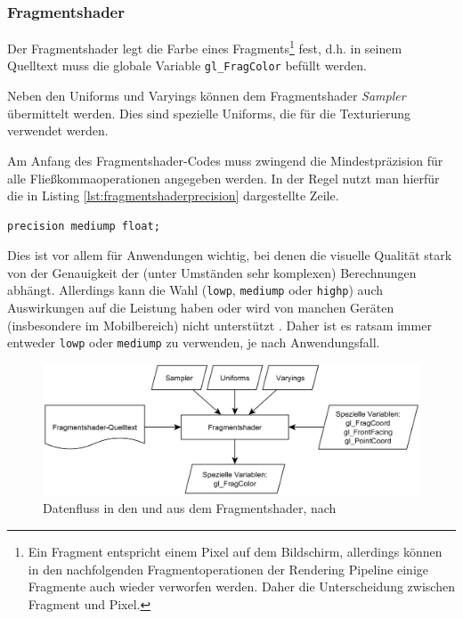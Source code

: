 \subsubsection{Fragmentshader}
Der Fragmentshader legt die Farbe eines Fragments\footnote{Ein Fragment entspricht einem Pixel auf dem Bildschirm, allerdings können in den nachfolgenden Fragmentoperationen der Rendering Pipeline einige Fragmente auch wieder verworfen werden. Daher die Unterscheidung zwischen Fragment und Pixel.} fest, d.h. in seinem Quelltext muss die globale Variable \texttt{gl\_FragColor} befüllt werden.

Neben den Uniforms und Varyings können dem Fragmentshader \textit{Sampler} übermittelt werden. Dies sind spezielle Uniforms, die für die Texturierung verwendet werden.

Am Anfang des Fragmentshader-Codes muss zwingend die Mindestpräzision für alle Fließkommaoperationen angegeben werden. In der Regel nutzt man hierfür die in Listing \ref{lst:fragmentshaderprecision} dargestellte Zeile.
\lstset{language=C}
\begin{lstlisting}[caption={Festlegen der Mindestpräzision für alle Fließkommaoperationen}, label={lst:fragmentshaderprecision}]
precision mediump float;
\end{lstlisting}
Dies ist vor allem für Anwendungen wichtig, bei denen die visuelle Qualität stark von der Genauigkeit der (unter Umständen sehr komplexen) Berechnungen abhängt. Allerdings kann die Wahl (\texttt{lowp}, \texttt{mediump} oder \texttt{highp}) auch Auswirkungen auf die Leistung haben oder wird von manchen Geräten (insbesondere im Mobilbereich) nicht unterstützt \autocite{WebGlPrecision}. Daher ist es ratsam immer entweder \texttt{lowp} oder \texttt{mediump} zu verwenden, je nach Anwendungsfall.
\begin{figure}
\centering
\includegraphics[width=\textwidth]{bilder/fragmentshader.png}
\caption{Datenfluss in den und aus dem Fragmentshader, nach \autocite{WebGlPogramming}}
\label{fig:fragmentshader}
\end{figure}

